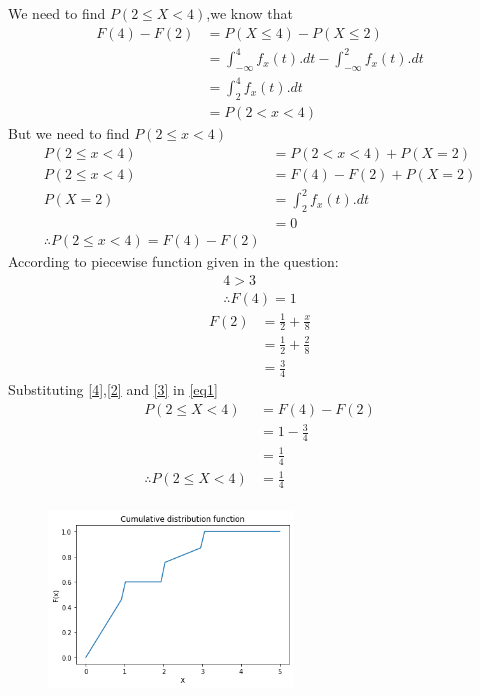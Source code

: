 \documentclass[journal,12pt,twocolumn]{IEEEtran}
\begin{document}
We need to find $P(2 \leq X <4)$,we know that\\
\begin{align}
F(4)-F(2)&=P(X \leq 4)-P(X \leq 2)\\
&=\int _{- \infty }^{4}f_x(t).dt -\int _{- \infty }^{2}f_x(t).dt \\
&=\int _{2 }^{4}f_x(t).dt \\
&= P(2 <x<4) \label{int}
\end{align}
But we need to find $ P(2 \leq x<4) $
\begin{align}
P(2 \leq x<4)&=P(2 <x<4)+P(X=2)\\
P(2 \leq x<4)&=F(4)-F(2)+P(X=2)  \\
P(X=2)&= \int _{2 }^{2}f_x(t).dt \\
&=0 \label{2}\\
\therefore P(2 \leq x<4)=F(4)-F(2) \label{eq1}
\end{align}
According to piecewise function given in the question:\\

\begin{align}
4>3\\
\therefore F(4)=1 \label{3}
\end{align}
\begin{align}
F(2)&=\frac{1}{2}+ \frac{x}{8}\\
 &=\frac{1}{2}+ \frac{2}{8}\\
 &=\frac{3}{4} \label{4}
\end{align}
Substituting \eqref{4},\eqref{2} and \eqref{3} in \eqref{eq1}
\begin{align}
P(2 \leq X <4)&=F(4)-F(2)\\
&=1-\frac{3}{4}\\
&=\frac{1}{4}\\
\therefore P(2 \leq X <4)&=\frac{1}{4}\\
\end{align}



\begin{figure}[htb!]
\begin{center}
\includegraphics[width=0.58\textwidth]{assign2.png}
\end{center}
\end{figure}
\end{document}
